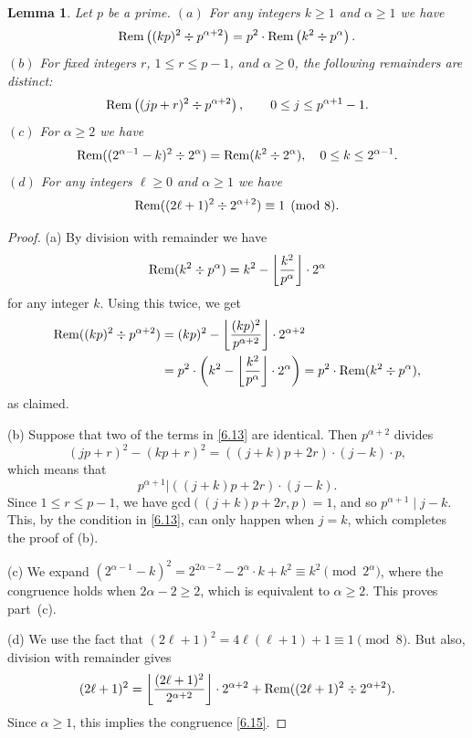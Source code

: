\documentclass{amsart}
\theoremstyle{plain}
\newtheorem{lemma}[theorem]{Lemma}
\numberwithin{equation}{section}
\begin{document}
\begin{lemma}\label{lem:6.3}
Let $p$ be a prime. $(a)$ For any integers $k\geq 1$ and $\alpha\geq 1$ we have
\begin{equation}\label{6.12}
{\rm Rem}\left((kp)^2\div p^{\alpha+2}\right)
=p^2\cdot{\rm Rem}\left(k^2\div p^{\alpha}\right).
\end{equation}
$(b)$ For fixed integers $r$, $1\leq r\leq p-1$, and $\alpha\geq 0$, the 
following remainders are distinct:
\begin{equation}\label{6.13}
{\rm Rem}\left((jp+r)^2\div p^{\alpha+2}\right),\qquad
0\leq j\leq p^{\alpha+1}-1.
\end{equation}
$(c)$ For $\alpha\geq 2$ we have
\begin{equation}\label{6.14}
{\rm Rem}((2^{\alpha-1}-k)^2\div 2^\alpha)={\rm Rem}(k^2\div 2^\alpha),\quad
0\leq k\leq 2^{\alpha-1}.
\end{equation}
$(d)$ For any integers $\ell\geq 0$ and $\alpha\geq 1$ we have
\begin{equation}\label{6.15}
{\rm Rem}((2\ell+1)^2\div 2^{\alpha+2})\equiv 1\pmod{8}.
\end{equation}
\end{lemma}

\begin{proof}
(a) By division with remainder we have
\[
{\rm Rem}(k^2\div p^{\alpha})
=k^2-\left\lfloor\frac{k^2}{p^{\alpha}}\right\rfloor\cdot 2^{\alpha}
\]
for any integer $k$. Using this twice, we get
\begin{align*}
{\rm Rem}((kp)^2\div p^{\alpha+2})
&= (kp)^2-\left\lfloor\frac{(kp)^2}{p^{\alpha+2}}\right\rfloor
\cdot 2^{\alpha+2} \\
&=p^2\cdot\left(k^2-\left\lfloor\frac{k^2}{p^{\alpha}}\right\rfloor
\cdot 2^{\alpha}\right) = p^2\cdot{\rm Rem}(k^2\div p^{\alpha}),
\end{align*}
as claimed.

(b) Suppose that two of the terms in \eqref{6.13} are identical. Then 
$p^{\alpha+2}$ divides
\[
(jp+r)^2-(kp+r)^2 = ((j+k)p+2r)\cdot(j-k)\cdot p,
\]
which means that
\[
p^{\alpha+1}\left| ((j+k)p+2r)\cdot(j-k). \right.
\]
Since $1\leq r\leq p-1$, we have gcd$((j+k)p+2r,p)=1$, and so 
$p^{\alpha+1}\mid j-k$. This, by the condition in \eqref{6.13}, can only happen
when $j=k$, which completes the proof of (b).

(c) We expand $\left(2^{\alpha-1}-k\right)^2=2^{2\alpha-2}-2^\alpha\cdot k+k^2
\equiv k^2\pmod{2^\alpha}$,
where the congruence holds when $2\alpha-2\geq 2$, which is equivalent to 
$\alpha\geq 2$. This proves part~(c).

(d) We use the fact that $(2\ell+1)^2=4\ell(\ell+1)+1\equiv1\pmod{8}$. But 
also, division with remainder gives
\[
(2\ell+1)^2 = \left\lfloor\frac{(2\ell+1)^2}{2^{\alpha+2}}\right\rfloor
\cdot 2^{\alpha+2}+{\rm Rem}((2\ell+1)^2\div 2^{\alpha+2}).
\]
Since $\alpha\geq1$, this implies the congruence \eqref{6.15}.
\end{proof}
\end{document}

